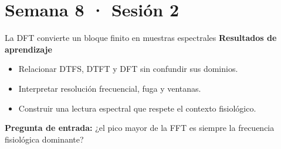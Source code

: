\documentclass[
  ignorenonframetext,
  aspectratio=169,
  spanish,
  professionalfonts]{beamer}
\providecommand{\tightlist}{%
  \setlength{\itemsep}{0pt}\setlength{\parskip}{0pt}}
\begin{document}
\section{Semana 8 · Sesión 2}\label{semana-8-sesiuxf3n-2}

\begin{frame}{La DFT convierte un bloque finito en muestras espectrales}
\protect{}\label{la-dft-convierte-un-bloque-finito-en-muestras-espectrales}
\textbf{Resultados de aprendizaje}

\begin{itemize}
\tightlist
\item
  Relacionar DTFS, DTFT y DFT sin confundir sus dominios.
\item
  Interpretar resolución frecuencial, fuga y ventanas.
\item
  Construir una lectura espectral que respete el contexto fisiológico.
\end{itemize}

\textbf{Pregunta de entrada:} ¿el pico mayor de la FFT es siempre la
frecuencia fisiológica dominante?
\end{frame}
\end{document}
